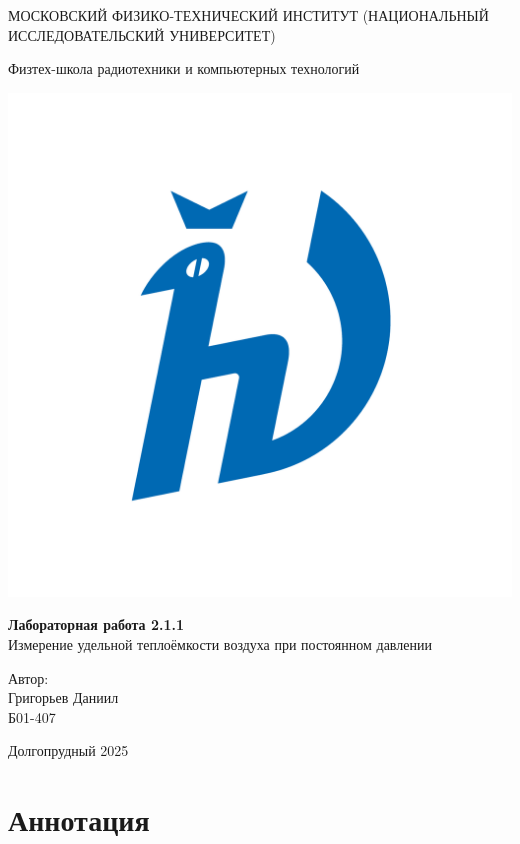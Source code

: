 \documentclass[a4paper,12pt]{article}
\begin{document}
\begin{titlepage}
\begin{center}
    {\large МОСКОВСКИЙ ФИЗИКО-ТЕХНИЧЕСКИЙ ИНСТИТУТ (НАЦИОНАЛЬНЫЙ ИССЛЕДОВАТЕЛЬСКИЙ УНИВЕРСИТЕТ)}
\end{center}

\begin{center}
    {\large Физтех-школа радиотехники и компьютерных технологий}
\end{center}

\vspace{3.5cm}

\begin{center}
    \includegraphics[width=0.4\linewidth]{hv_full.png}
\end{center}

\vspace{0.1cm}

{\huge
\begin{center}
    {\bf Лабораторная работа 2.1.1}\\
    Измерение удельной теплоёмкости воздуха при постоянном давлении
\end{center}
}

\vspace{2cm}

\begin{flushright}
{\LARGE Автор:\\ Григорьев Даниил \\
\vspace{0.2cm}
Б01-407}
\end{flushright}

\vspace{3.5cm}
\begin{center}
    Долгопрудный 2025
\end{center}
\end{titlepage}

\section{Аннотация}
\end{document}
